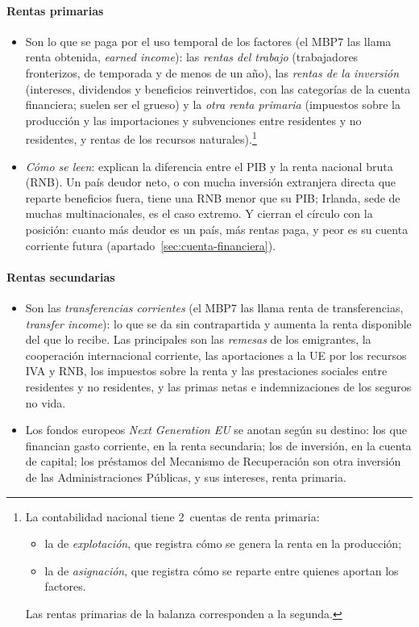 \documentclass[11pt]{article}
\begin{document}
\paragraph{Rentas primarias}
\begin{itemize}
\item Son lo que se paga por el uso temporal de los factores (el MBP7 las llama renta obtenida, \emph{earned income})\nocite{FMI2009MBP6,FMI2025BPM7}: las \emph{rentas del trabajo} (trabajadores fronterizos, de temporada y de menos de un año), las \emph{rentas de la inversión} (intereses, dividendos y beneficios reinvertidos, con las categorías de la cuenta financiera; suelen ser el grueso) y la \emph{otra renta primaria} (impuestos sobre la producción y las importaciones y subvenciones entre residentes y no residentes, y rentas de los recursos naturales).\footnote{La contabilidad nacional tiene 2~cuentas de renta primaria:
\begin{itemize}
\item la de \emph{explotación}, que registra cómo se genera la renta en la producción;
\item la de \emph{asignación}, que registra cómo se reparte entre quienes aportan los factores.
\end{itemize}
Las rentas primarias de la balanza corresponden a la segunda.}
\item \emph{Cómo se leen}: explican la diferencia entre el PIB y la renta nacional bruta (RNB). Un país deudor neto, o con mucha inversión extranjera directa que reparte beneficios fuera, tiene una RNB menor que su PIB; Irlanda, sede de muchas multinacionales, es el caso extremo. Y cierran el círculo con la posición: cuanto más deudor es un país, más rentas paga, y peor es su cuenta corriente futura (apartado~\ref{sec:cuenta-financiera}).
\end{itemize}

\paragraph{Rentas secundarias}
\begin{itemize}
\item Son las \emph{transferencias corrientes} (el MBP7 las llama renta de transferencias, \emph{transfer income}): lo que se da sin contrapartida y aumenta la renta disponible del que lo recibe\nocite{FMI2009MBP6}. Las principales son las \emph{remesas} de los emigrantes, la cooperación internacional corriente, las aportaciones a la UE por los recursos IVA y RNB, los impuestos sobre la renta y las prestaciones sociales entre residentes y no residentes, y las primas netas e indemnizaciones de los seguros no vida.
\item Los fondos europeos \emph{Next Generation EU} se anotan según su destino: los que financian gasto corriente, en la renta secundaria; los de inversión, en la cuenta de capital; los préstamos del Mecanismo de Recuperación son otra inversión de las Administraciones Públicas, y sus intereses, renta primaria\nocite{BdE2022NGEU}.
\end{itemize}
\end{document}
